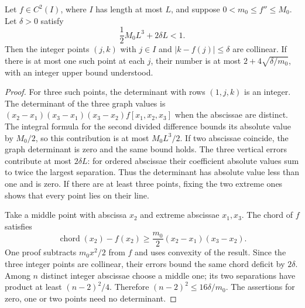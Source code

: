 \begin{lemma}\label{inf:lattice-strip}
Let $f\in C^2(I)$, where $I$ has length at most $L$, and suppose
$0<m_0\le f''\le M_0$. Let $\delta>0$ satisfy
\[
 \frac12M_0L^3+2\delta L<1.
\]
Then the integer points $(j,k)$ with $j\in I$ and
$|k-f(j)|\le\delta$ are collinear. If there is at most one such point
at each $j$, their number is at most
$2+4\sqrt{\delta/m_0}$, with an integer upper bound understood.
\end{lemma}
\begin{proof}
For three such points, the determinant with rows $(1,j,k)$ is an
integer. The determinant of the three graph values is
$(x_2-x_1)(x_3-x_1)(x_3-x_2)f[x_1,x_2,x_3]$ when the abscissae
are distinct. The integral formula for the second divided
difference bounds its absolute value by $M_0/2$, so this
contribution is at most $M_0L^3/2$. If two abscissae coincide,
the graph determinant is zero and the same bound holds. The three vertical errors contribute at most
$2\delta L$: for ordered abscissae their coefficient absolute values
sum to twice the largest separation. Thus the determinant has
absolute value less than one and is zero. If there are at least three
points, fixing the two extreme ones shows that every point lies on
their line.

Take a middle point with abscissa $x_2$ and extreme abscissae
$x_1,x_3$. The chord of $f$ satisfies
\[
 \operatorname{chord}(x_2)-f(x_2)
 \ge\frac{m_0}{2}(x_2-x_1)(x_3-x_2).
\]
One proof subtracts $m_0x^2/2$ from $f$ and uses convexity of the
result. Since the three integer points are collinear, their errors
bound the same chord deficit by $2\delta$. Among $n$ distinct integer
abscissae choose a middle one; its two separations have product at
least $(n-2)^2/4$. Therefore $(n-2)^2\le16\delta/m_0$.
The assertions for zero, one or two points need no determinant.
\end{proof}

